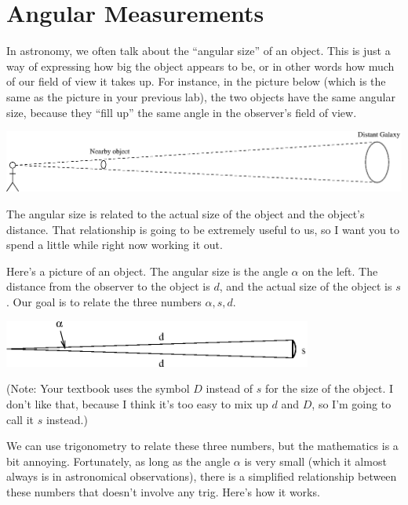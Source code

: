 \section{Angular Measurements}
\makelabheader %

In astronomy, we often talk about the ``angular size'' of an object.
This is just a way of expressing how big the object appears to be, or
in other words how much of our field of view it takes up.  For
instance, in the picture below (which is the same as the picture in
your previous lab), the two objects have the same angular size,
because they ``fill up'' the same angle in the observer's
field of view.

\medskip
\centerline{\includegraphics[width=\textwidth]{localdistance/localdistance1.eps}}
\medskip

The angular size is related to the actual size of the object and the
object's distance.  That relationship is going to be extremely useful
to us, so I want you to spend a little while right now working it out.

Here's a picture of an object.  The angular size is the angle $\alpha$
on the left.  The distance from the observer to the object is $d$, and
the actual size of the object is $s$.  Our goal is to relate the
three numbers $\alpha,s,d$.

\medskip
\centerline{\includegraphics[width=4in]{angularsize/angularsizefig1.eps}}
\medskip

(Note: Your textbook uses the symbol $D$ instead of $s$ for
the size of the object.  I don't like that, because I think it's
too easy to mix up $d$ and $D$, so I'm going to call it $s$ instead.)

We can use trigonometry to relate these three numbers, but the
mathematics is a bit annoying.  Fortunately, as long as the angle
$\alpha$ is very small (which it almost always is
in astronomical observations), there is a simplified
relationship between these numbers that doesn't involve
any trig.  Here's how it works.

